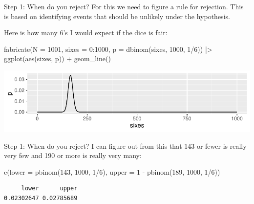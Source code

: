 \documentclass[
  11pt,
  ignorenonframetext,
]{beamer}
\newenvironment{Shaded}{\begin{snugshade}}{\end{snugshade}}
\newcommand{\AttributeTok}[1]{\textcolor[rgb]{0.40,0.45,0.13}{#1}}
\newcommand{\DecValTok}[1]{\textcolor[rgb]{0.68,0.00,0.00}{#1}}
\newcommand{\FunctionTok}[1]{\textcolor[rgb]{0.28,0.35,0.67}{#1}}
\newcommand{\NormalTok}[1]{\textcolor[rgb]{0.00,0.23,0.31}{#1}}
\newcommand{\SpecialCharTok}[1]{\textcolor[rgb]{0.37,0.37,0.37}{#1}}
\begin{document}
\begin{frame}[fragile]{Step 1: When do you reject?}
\protect\hypertarget{step-1-when-do-you-reject}{}
For this we need to figure a rule for rejection. This is based on
identifying events that should be unlikely under the hypothesis.

Here is how many 6's I would expect if the dice is fair:

\begin{Shaded}
\begin{Highlighting}[]
\FunctionTok{fabricate}\NormalTok{(}\AttributeTok{N =} \DecValTok{1001}\NormalTok{, }\AttributeTok{sixes =} \DecValTok{0}\SpecialCharTok{:}\DecValTok{1000}\NormalTok{, }\AttributeTok{p =} \FunctionTok{dbinom}\NormalTok{(sixes, }\DecValTok{1000}\NormalTok{, }\DecValTok{1}\SpecialCharTok{/}\DecValTok{6}\NormalTok{)) }\SpecialCharTok{|\textgreater{}}
  \FunctionTok{ggplot}\NormalTok{(}\FunctionTok{aes}\NormalTok{(sixes, p)) }\SpecialCharTok{+} \FunctionTok{geom\_line}\NormalTok{()}
\end{Highlighting}
\end{Shaded}

\includegraphics{0_lectures_files/figure-beamer/unnamed-chunk-434-1.pdf}
\end{frame}

\begin{frame}[fragile]{Step 1: When do you reject?}
\protect\hypertarget{step-1-when-do-you-reject-1}{}
I can figure out from this that 143 or fewer is really very few and 190
or more is really very many:

\begin{Shaded}
\begin{Highlighting}[]
\FunctionTok{c}\NormalTok{(}\AttributeTok{lower =} \FunctionTok{pbinom}\NormalTok{(}\DecValTok{143}\NormalTok{, }\DecValTok{1000}\NormalTok{, }\DecValTok{1}\SpecialCharTok{/}\DecValTok{6}\NormalTok{), }\AttributeTok{upper =} \DecValTok{1} \SpecialCharTok{{-}} \FunctionTok{pbinom}\NormalTok{(}\DecValTok{189}\NormalTok{, }\DecValTok{1000}\NormalTok{, }\DecValTok{1}\SpecialCharTok{/}\DecValTok{6}\NormalTok{))}
\end{Highlighting}
\end{Shaded}

\begin{verbatim}
     lower      upper 
0.02302647 0.02785689 
\end{verbatim}
\end{frame}
\end{document}
